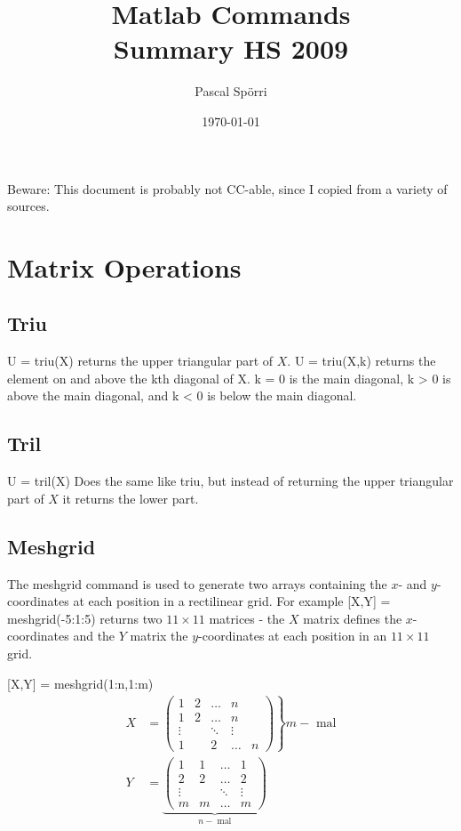 \documentclass[a4paper]{scrartcl}
\author{Pascal Spörri}
\title{Matlab Commands\\Summary HS 2009}
\date{\today}
\begin{document}
\maketitle
Beware: This document is probably not CC-able, since I copied from a variety of sources.
\section{Matrix Operations}
	\subsection{Triu} 
		U = triu(X) returns the upper triangular part of $X$.
		U = triu(X,k) returns the element on and above the kth 
		diagonal of X. k = 0 is the main diagonal, k > 0 is above 
		the main diagonal, and k < 0 is below the main diagonal.
	\subsection{Tril}
		U = tril(X) Does the same like triu, but instead of returning the upper triangular part of $X$ it returns the lower part.
	\subsection{Meshgrid} 
		The meshgrid command is used to generate two arrays 
		containing the $x$- and $y$-coordinates at each position in 
		a rectilinear grid. For example [X,Y] = meshgrid(-5:1:5) 
		returns two $11 \times 11$ matrices - the $X$ matrix defines the 
		$x$-coordinates and the $Y$ matrix the $y$-coordinates at each 
		position in an $11 \times 11$ grid.
		
		[X,Y] = meshgrid(1:n,1:m)
		\begin{align*}
			X &= \left. \begin{pmatrix}
				1 & 2 & \ldots & n\\
				1 & 2 & \ldots & n\\
				\vdots & & \ddots & \vdots \\
				1 & & 2 & \ldots & n 
				\end{pmatrix} \right\} m-\text{ mal}\\
			Y &= \underbrace{\begin{pmatrix}
						1 & 1 & \ldots & 1\\
						2 & 2 & \ldots & 2\\
						\vdots & &\ddots &\vdots\\
						m & m & \ldots & m 
					\end{pmatrix}}_{n-\text{ mal}}
		\end{align*}
\end{document}
